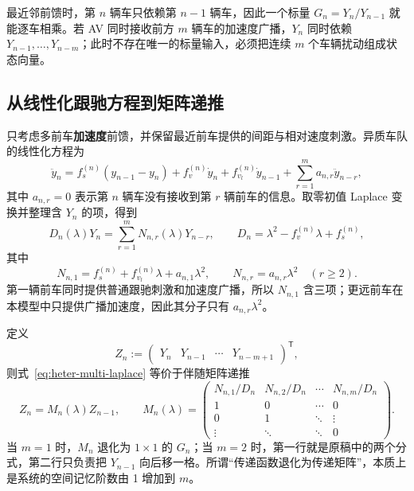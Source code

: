 \documentclass[11pt,a4paper,openany]{book}
\numberwithin{equation}{chapter}
\numberwithin{figure}{chapter}
\numberwithin{table}{chapter}
\begin{document}
最近邻前馈时，第 $n$ 辆车只依赖第 $n-1$ 辆车，因此一个标量 $G_n=Y_n/Y_{n-1}$ 就能逐车相乘。若 AV 同时接收前方 $m$ 辆车的加速度广播，$Y_n$ 同时依赖 $Y_{n-1},\ldots,Y_{n-m}$；此时不存在唯一的标量输入，必须把连续 $m$ 个车辆扰动组成状态向量。

\subsection{从线性化跟驰方程到矩阵递推}

只考虑多前车\textbf{加速度}前馈，并保留最近前车提供的间距与相对速度刺激。异质车队的线性化方程为
\begin{equation}
\ddot y_n
=f_s^{(n)}(y_{n-1}-y_n)+f_v^{(n)}\dot y_n
+f_{v_l}^{(n)}\dot y_{n-1}
+\sum_{r=1}^{m}a_{n,r}\ddot y_{n-r},
\label{eq:heter-multi-time}
\end{equation}
其中 $a_{n,r}=0$ 表示第 $n$ 辆车没有接收到第 $r$ 辆前车的信息。取零初值 Laplace 变换并整理含 $Y_n$ 的项，得到
\begin{equation}
D_n(\lambda)Y_n
=\sum_{r=1}^{m}N_{n,r}(\lambda)Y_{n-r},
\qquad
D_n=\lambda^2-f_v^{(n)}\lambda+f_s^{(n)},
\label{eq:heter-multi-laplace}
\end{equation}
其中
\begin{equation}
N_{n,1}=f_s^{(n)}+f_{v_l}^{(n)}\lambda+a_{n,1}\lambda^2,
\qquad
N_{n,r}=a_{n,r}\lambda^2\quad(r\ge2).
\label{eq:heter-multi-numerators}
\end{equation}
第一辆前车同时提供普通跟驰刺激和加速度广播，所以 $N_{n,1}$ 含三项；更远前车在本模型中只提供广播加速度，因此其分子只有 $a_{n,r}\lambda^2$。

定义
\begin{equation}
Z_n:=\begin{pmatrix}Y_n&Y_{n-1}&\cdots&Y_{n-m+1}\end{pmatrix}^{\!\mathsf T},
\end{equation}
则式~\eqref{eq:heter-multi-laplace} 等价于伴随矩阵递推
\begin{equation}
Z_n=M_n(\lambda)Z_{n-1},
\qquad
M_n(\lambda)=
\begin{pmatrix}
N_{n,1}/D_n&N_{n,2}/D_n&\cdots&N_{n,m}/D_n\\
1&0&\cdots&0\\
0&1&\ddots&\vdots\\
\vdots&\ddots&\ddots&0
\end{pmatrix}.
\label{eq:heter-multi-matrix}
\end{equation}
当 $m=1$ 时，$M_n$ 退化为 $1\times1$ 的 $G_n$；当 $m=2$ 时，第一行就是原稿中的两个分式，第二行只负责把 $Y_{n-1}$ 向后移一格。所谓“传递函数退化为传递矩阵”，本质上是系统的空间记忆阶数由 1 增加到 $m$。
\end{document}
